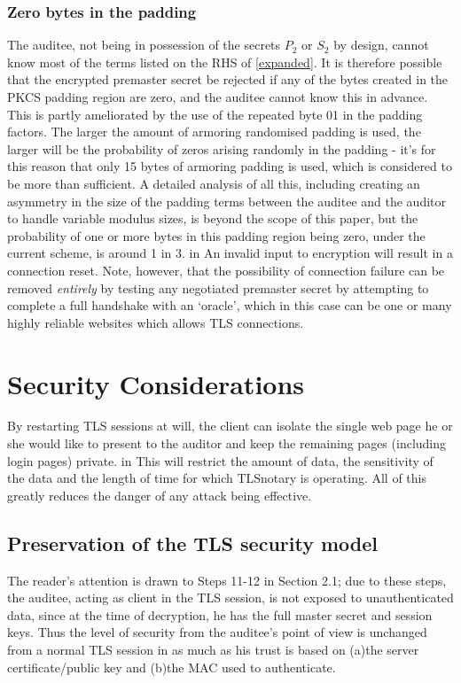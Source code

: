 \documentclass[10pt,a4paper]{article}
\begin{document}
\subsubsection{Zero bytes in the padding}
\noindent The auditee, not being in possession of the secrets $P_2$ or $S_2$ by design, cannot know most of the terms listed on the RHS of \eqref{expanded}. It is therefore possible that the encrypted premaster secret be rejected if any of the bytes created in the PKCS padding region are zero, and the auditee cannot know this in advance. This is partly ameliorated by the use of the repeated byte 01 in the padding factors. The larger the amount of armoring randomised padding is used, the larger will be the probability of zeros arising randomly in the padding - it's for this reason that only 15 bytes of armoring padding is used, which is considered to be more than sufficient. A detailed analysis of all this, including creating an asymmetry in the size of the padding terms between the auditee and the auditor to handle variable modulus sizes, is beyond the scope of this paper, but the probability of one or more bytes in this padding region being zero, under the current scheme, is around 1 in 3.
 in
\noindent An invalid input to encryption will result in a connection reset. Note, however, that the possibility of connection failure can be removed \emph{entirely} by testing any negotiated premaster secret by attempting to complete a full handshake with an `oracle', which in this case can be one or many highly reliable websites which allows TLS connections.

\section{Security Considerations}

\noindent By restarting TLS sessions at will, the client can isolate the single web page he or she would like to present to the auditor and keep the remaining pages (including login pages) private.
 in
\noindent This will restrict the amount of data, the sensitivity of the data and the length of time for which TLSnotary is operating. All of this greatly reduces the danger of any attack being effective.

\subsection{Preservation of the TLS security model}

\noindent The reader's attention is drawn to Steps 11-12 in Section 2.1; due to these steps, the auditee, acting as client in the TLS session, is not exposed to unauthenticated data, since at the time of decryption, he has the full master secret and session keys. Thus the level of security from the auditee's point of view is unchanged from a normal TLS session in as much as his trust is based on (a)the server certificate/public key and (b)the MAC used to authenticate.
\end{document}
